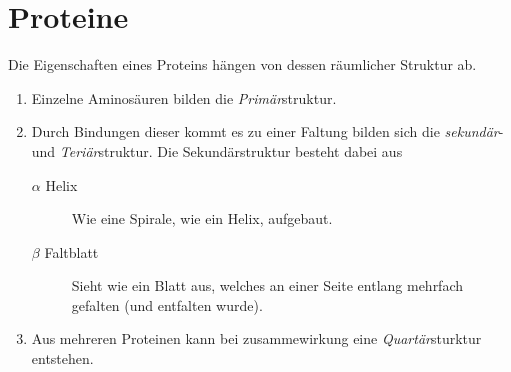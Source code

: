 \documentclass{article}
\begin{document}
\section{Proteine}
Die Eigenschaften eines Proteins hängen von dessen räumlicher Struktur ab.
\begin{enumerate}
 \item Einzelne Aminosäuren bilden die \emph{Primär}struktur. 
 \item Durch Bindungen dieser kommt es zu einer Faltung bilden sich die \emph{sekundär}- und \emph{Teriär}struktur. Die Sekundärstruktur besteht dabei aus
 \begin{description}
  \item[$\alpha$ Helix] Wie eine Spirale, wie ein Helix, aufgebaut.
  \item[$\beta$ Faltblatt] Sieht wie ein Blatt aus, welches an einer Seite entlang mehrfach gefalten (und entfalten wurde).
 \end{description} 
 \item Aus mehreren Proteinen kann bei zusammewirkung eine \emph{Quartär}sturktur entstehen. 
\end{enumerate}
\end{document}
